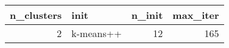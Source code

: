 \begin{tabular}{rlrr}
\toprule
n_clusters & init & n_init & max_iter \\
\midrule
2 & k-means++ & 12 & 165 \\
\bottomrule
\end{tabular}
